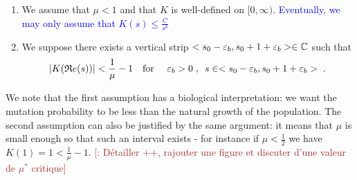 \documentclass[11pt]{amsart}
\renewcommand{\Re}{\mathfrak{R}e}
\newcommand{\blue}[1]{\textcolor{blue}{#1}}
\newcommand{\ndr}[1]{\textcolor{brown}{[#1]}}
\begin{document}
\begin{hypothesis}\label{hyp:boundK} \mbox{}
    \begin{enumerate}
        \item We assume that $\mu < 1$ and that $K$ is well-defined on $[0, \infty)$.  \blue{Eventually, we may only assume that $K(s) \leq \frac{C}{s^k}$} 
        \item We suppose there exists a vertical strip $<s_0-\varepsilon_b, s_0+1+\varepsilon_b> \in \mathbb{C}$ such that 
        $$|K(\Re(s))| < \frac{1}{\mu} - 1
        \mtext{for } \varepsilon_b > 0 \eqsepv s \in <s_0-\varepsilon_b, s_0+1+\varepsilon_b>\eqfinp$$ 
    \end{enumerate}
\end{hypothesis}
We note that the first assumption has a biological interpretation: we want the mutation probability to be less than the natural growth of the population. The second assumption can also be justified by the same argument: it means that $\mu$ is small enough so that  such an interval exists - for instance if $\mu<\frac{1}{2}$ we have $K(1)=1<\frac{1}{\mu}-1.$  \ndr{: Détailler ++, rajouter une figure et discuter d'une valeur de $\mu^* $ critique}
\end{document}
